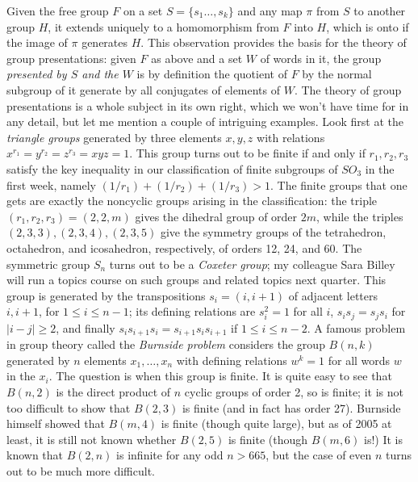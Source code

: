 \documentclass[10pt]{article}
\begin{document}
Given the free group $F$ on a set $S=\{s_1\ldots,s_k\}$ and any map
$\pi$ from $S$ to another group $H$, it extends uniquely to a
homomorphism from $F$ into $H$, which is onto if the image of $\pi$
generates $H$. This observation provides the basis for the theory of
group presentations: given $F$ as above and a set $W$ of words in it,
the group {\sl presented by $S$ and the $W$} is by definition the
quotient of $F$ by the normal subgroup of it generate by all conjugates
of elements of $W$. The theory of group presentations is a whole subject
in its own right, which we won't have time for in any detail, but let me
mention a couple of intriguing examples. Look first at the {\sl triangle
  groups} generated by three elements $x,y,z$ with relations
$x^{r_1}=y^{r_2}=z^{r_3}=xyz=1$. This group turns out to be finite if
and only if $r_1,r_2,r_3$ satisfy the key inequality in our
classification of finite subgroups of $SO_3$ in the first week, namely
$(1/r_1) + (1/r_2) + (1/r_3) > 1$. The finite groups that one gets are
exactly the noncyclic groups arising in the classification: the triple
$(r_1,r_2,r_3) = (2,2,m)$ gives the dihedral group of order $2m$, while
the triples $(2,3,3),(2,3,4),(2,3,5)$ give the symmetry groups of the
tetrahedron, octahedron, and icosahedron, respectively, of orders 12,
24, and 60. The symmetric group $S_n$ turns out to be a {\sl Coxeter
  group}; my colleague Sara Billey will run a topics course on such
groups and related topics next quarter. This group is generated by the
transpositions $s_i = (i,i+1)$ of adjacent letters $i,i+1$, for $1\le
i\le n-1$; its defining relations are $s_i^2 = 1$ for all $i$, $s_i s_j
= s_j s_i$ for $ | i - j |\ge2$, and finally $s_i s_{i+1} s_i = s_{i+1}
s_i s_{i+1}$ if $1\le i\le n-2$. A famous problem in group theory called
the {\sl Burnside problem} considers the group $B(n,k)$ generated by $n$
elements $x_1,\ldots,x_n$ with defining relations $w^k = 1$ for all
words $w$ in the $x_i$. The question is when this group is finite. It is
quite easy to see that $B(n,2)$ is the direct product of $n$ cyclic
groups of order 2, so is finite; it is not too difficult to show that
$B(2,3)$ is finite (and in fact has order 27). Burnside himself showed
that $B(m,4)$ is finite (though quite large), but as of 2005 at least,
it is still not known whether $B(2,5)$ is finite (though $B(m,6)$ is!)
It is known that $B(2,n)$ is infinite for any odd $n>665$, but the case
of even $n$ turns out to be much more difficult.
\end{document}
